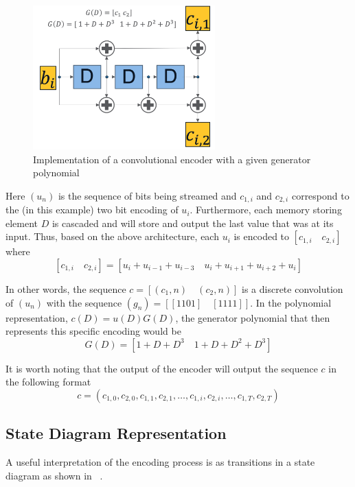 \begin{figure}
\centering\CaptionFontSize
\includegraphics[height=15em]
{Figures/convolutional_encoding_hw.png}
\caption[Implementation of a convolutional encoder with a given generator polynomial]
{Implementation of a convolutional encoder with a given generator polynomial}
\label{Figure:Background:ConvolutionalEncoderArchitecture}
\end{figure}

Here $(u_n)$ is the sequence of bits being streamed and $c_{1,i}$ and $c_{2,i}$ correspond to the (in this example) two bit encoding of $u_i$. Furthermore, each memory storing element $D$ is cascaded and will store and output the last value that was at its input. Thus, based on the above architecture, each $u_i$ is encoded to $[c_{1,i} \quad c_{2,i}]$ where 
$$[c_{1,i} \quad c_{2,i}] = [ u_i + u_{i-1} + u_{i-3} \quad u_i + u_{i+1} + u_{i+2} + u_i]$$

In other words, the sequence $c = [(c_1,n)  \quad (c_2,n) ]$ is a discrete convolution of $(u_n)$ with the sequence $(g_n) =  [ [1  1 0 1] \quad [1 1 1 1]]$. In the polynomial representation, $c(D) = u(D)G(D)$, the generator polynomial that then represents this specific encoding would be 
$$G(D) =	[1 + D + D^3  \quad 1+ D + D^2 + D^3]$$

It is worth noting that the output of the encoder will output the sequence $c$ in the following format
$$c = (c_{1,0}, c_{2,0}, c_{1,1}, c_{2,1}, \ldots, c_{1,i}, c_{2,i}, \ldots, c_{1,T}, c_{2,T})$$

\subsection{State Diagram Representation}
A useful interpretation of the encoding process is as transitions in a state diagram as shown in \Figure~.

